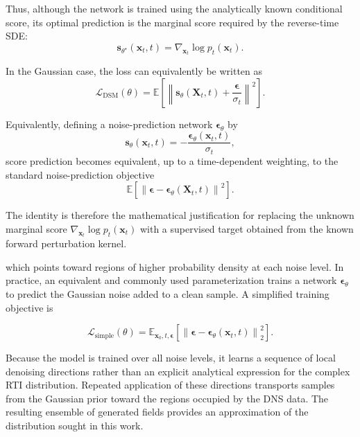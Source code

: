 \documentclass[11pt,a4paper]{article}
\begin{document}
Thus, although the network is trained using the analytically known conditional score, its optimal prediction is the marginal score required by the reverse-time SDE:
\begin{equation*}
\boxed{
\mathbf{s}_{\theta^\star}(\mathbf{x}_t,t)
=
\nabla_{\mathbf{x}_t}\log p_t(\mathbf{x}_t).
}
\end{equation*}

In the Gaussian case, the loss can equivalently be written as
\begin{equation*}
\mathcal{L}_{\mathrm{DSM}}(\theta)
=
\mathbb{E}
\left[
\left\|
\mathbf{s}_{\theta}(\mathbf{X}_t,t)
+
\frac{\boldsymbol{\epsilon}}{\sigma_t}
\right\|^2
\right].
\end{equation*}

Equivalently, defining a noise-prediction network
$\boldsymbol{\epsilon}_{\theta}$ by
\begin{equation*}
\mathbf{s}_{\theta}(\mathbf{x}_t,t)
=
-\frac{
\boldsymbol{\epsilon}_{\theta}(\mathbf{x}_t,t)
}{
\sigma_t
},
\end{equation*}
score prediction becomes equivalent, up to a time-dependent weighting, to the standard noise-prediction objective
\begin{equation*}
\mathbb{E}
\left[
\left\|
\boldsymbol{\epsilon}
-
\boldsymbol{\epsilon}_{\theta}(\mathbf{X}_t,t)
\right\|^2
\right].
\end{equation*}

The identity is therefore the mathematical justification for replacing the unknown marginal score
$\nabla_{\mathbf{x}_t}\log p_t(\mathbf{x}_t)$
with a supervised target obtained from the known forward perturbation kernel.






which points toward regions of higher probability density at each noise level.
In practice, an equivalent and commonly used parameterization trains a network
$\boldsymbol{\epsilon}_{\theta}$ to predict the Gaussian noise added to a clean
sample. A simplified training objective is

\begin{equation}
    \mathcal{L}_{\mathrm{simple}}(\theta)
    =
    \mathbb{E}_{\mathbf{x}_0,t,\boldsymbol{\epsilon}}
    \left[
        \left\|
        \boldsymbol{\epsilon}
        -
        \boldsymbol{\epsilon}_{\theta}(\mathbf{x}_t,t)
        \right\|_2^2
    \right].
\end{equation}

Because the model is trained over all noise levels, it learns a sequence of
local denoising directions rather than an explicit analytical expression for
the complex RTI distribution. Repeated application of these directions
transports samples from the Gaussian prior toward the regions occupied by the
DNS data. The resulting ensemble of generated fields provides an approximation
of the distribution sought in this work.
\end{document}
